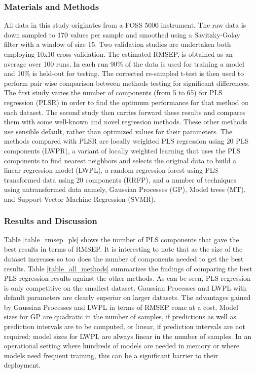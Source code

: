 \documentclass{llncs}
\begin{document}
\begin{itemize}
\subsubsection{Materials and Methods}
All data in this study originates from a FOSS 5000 instrument. The raw data is down sampled to 170 values per sample and smoothed using a Savitzky-Golay filter with a window of size 15. Two validation studies are undertaken both employing 10x10 cross-validation. The estimated RMSEP, is obtained as an average over 100 runs. In each run 90\% of the data is used for training a model and 10\% is held-out for testing. The corrected re-sampled t-test is then used to perform pair wise comparison between methods testing for significant differences. The first study varies the number of components (from 5 to 65) for PLS regression (PLSR) in order to find the optimum performance for that method on each dataset. The second study then carries forward these results and compares them with some well-known and novel regression methods. These other methods use sensible default, rather than optimized values for their parameters. The methods compared with PLSR are locally weighted PLS regression using 20 PLS components (LWPR), a variant of locally weighted learning that uses the PLS components to find nearest neighbors and selects the original data to build a linear regression model (LWPL), a random regression forest using PLS transformed data using 20 components (RRFP), and a number of techniques using untransformed data namely, Gaussian Processes (GP), Model trees (MT), and Support Vector Machine Regression (SVMR).

\subsubsection{Results and Discussion}
Table \ref{table_rmsep_pls} shows the number of PLS components that gave the best results in terms of RMSEP. It is interesting to note that as the size of the dataset increases so too does the number of components needed to get the best results. Table \ref{table_all_methods} summarizes the findings of comparing the best PLS regression results against the other methods. As can be seen, PLS regression is only competitive on the smallest dataset. Gaussian Processes and LWPL with default parameters are clearly superior on larger datasets. The advantages gained by Gaussian Processes and LWPL in terms of RMSEP come at a cost. Model sizes for GP are quadratic in the number of samples, if predictions as well as prediction intervals are to be computed, or linear, if prediction intervals are not required; model sizes for LWPL are always linear in the number of samples. In an operational setting where hundreds of models are needed in memory or where models need frequent training, this can be a significant barrier to their deployment.


\end{itemize}
\end{document}
